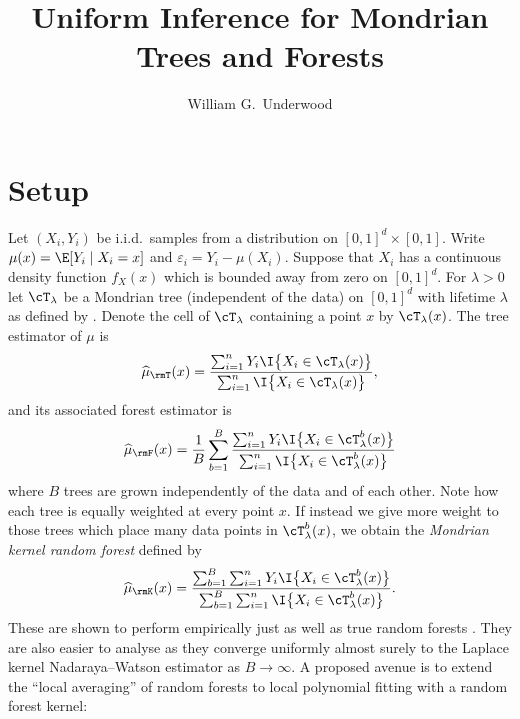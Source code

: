 \documentclass{article}
\title{Uniform Inference for Mondrian Trees and Forests}
\author{William G.\ Underwood}
\begin{document}
\maketitle







\section{Setup}

Let $(X_i, Y_i)$ be i.i.d.\ samples from a distribution
on $[0,1]^d \times [0,1]$.
Write $\mu(x) = \E[Y_i \mid X_i = x]$
and $\varepsilon_i = Y_i - \mu(X_i)$.
Suppose that $X_i$ has a continuous density function $f_X(x)$
which is bounded away from zero on $[0,1]^d$.
For $\lambda>0$ let $\cT_\lambda$ be a Mondrian tree
(independent of the data)
on $[0,1]^d$ with lifetime $\lambda$ as defined
by \cite{mourtada2020minimax}.
Denote the cell of $\cT_\lambda$ containing a point $x$
by $\cT_\lambda(x)$.
The tree estimator of $\mu$ is
%
\begin{align*}
  \widehat\mu_{\rmT}(x)
  =\frac{\sum_{i=1}^n Y_i
  \I\big\{ X_i \in \cT_\lambda(x) \big\}}
  {\sum_{i=1}^n
  \I\big\{ X_i \in \cT_\lambda(x) \big\}},
\end{align*}
%
and its associated forest estimator is
%
\begin{align*}
  \widehat\mu_{\rmF}(x)
  =\frac{1}{B}
  \sum_{b=1}^B
  \frac{\sum_{i=1}^n Y_i
  \I\big\{ X_i \in \cT^b_\lambda(x) \big\}}
  {\sum_{i=1}^n
  \I\big\{ X_i \in \cT^b_\lambda(x) \big\}}
\end{align*}
%
where $B$ trees are grown independently of the data
and of each other.
Note how each tree is equally weighted at every point $x$.
If instead we give more weight to those trees which place many
data points in $\cT^b_\lambda(x)$,
we obtain the \emph{Mondrian kernel random forest}
\cite{scornet2016random} defined by
%
\begin{align*}
  \widehat\mu_{\rmK}(x)
  = \frac{\sum_{b=1}^B \sum_{i=1}^n Y_i
  \I\big\{ X_i \in \cT^b_\lambda(x) \big\}}
  {\sum_{b=1}^B \sum_{i=1}^n
  \I\big\{ X_i \in \cT^b_\lambda(x) \big\}}.
\end{align*}
%
These are shown to perform empirically just as well as
true random forests \cite{scornet2016random}.
They are also easier to analyse as they converge
uniformly almost surely to the Laplace kernel
Nadaraya--Watson estimator as $B \to \infty$.
A proposed avenue is to extend the ``local averaging''
of random forests to local polynomial fitting with a random forest kernel:
\end{document}
